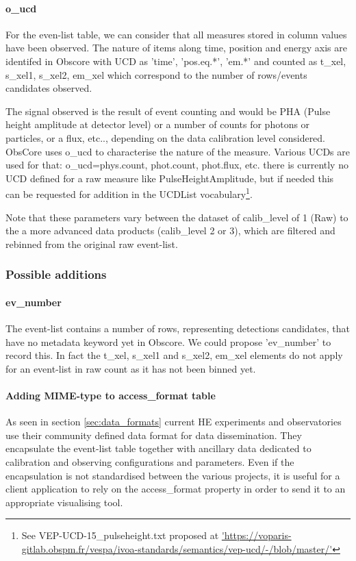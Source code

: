 \documentclass[11pt,a4paper]{ivoa}
\begin{document}
\paragraph{o\_ucd}
For the even-list table, we can consider that all measures stored in column values have been observed.
The nature of items along time, position and energy axis are identifed in Obscore with UCD as 'time', 'pos.eq.*', 'em.*'
and counted as t\_xel, s\_xel1, s\_xel2, em\_xel which correspond to the number of rows/events candidates observed.

The signal observed is the result of event counting and would be PHA (Pulse height amplitude at detector level) or a number of counts for photons or particles, or a flux, etc.., depending on the data calibration level considered.
ObsCore uses o\_ucd to characterise the nature of the measure.
Various UCDs are used for that: o\_ucd=phys.count, phot.count, phot.flux, etc. there is currently no UCD defined for a raw measure like PulseHeightAmplitude, but if needed this can be requested for addition in the UCDList vocabulary\footnote{See VEP-UCD-15\_pulseheight.txt proposed at \url{'https://voparis-gitlab.obspm.fr/vespa/ivoa-standards/semantics/vep-ucd/-/blob/master/'}}.

Note that these parameters vary between the dataset of calib\_level of 1 (Raw) to the a more advanced data products (calib\_level 2 or 3), which are filtered and rebinned from the original raw event-list.


\subsubsection{Possible additions}

\paragraph{ev\_number}
The event-list contains a number of rows, representing detections candidates, that have no metadata keyword yet in Obscore.
We could propose 'ev\_number' to record this.
In fact the t\_xel, s\_xel1 and s\_xel2, em\_xel elements do not apply for an event-list in raw count as it has not been binned yet.

\paragraph{Adding MIME-type to access\_format table}
As seen in section \ref{sec:data_formats} current \gls{HE} experiments and observatories use their community defined data format for data dissemination.
They encapsulate the event-list table together with ancillary data dedicated to calibration and observing configurations and parameters.
Even if the encapsulation is not standardised between the various projects, it is useful for a client application to rely on the access\_format property in order to send it to an appropriate visualising tool.
\end{document}
